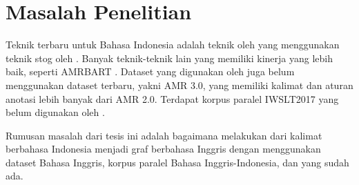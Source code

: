\section{Masalah Penelitian}

Teknik \crosslingual{} \amrparsing{} terbaru untuk Bahasa Indonesia adalah teknik oleh \textcite{putra2022} yang menggunakan teknik \gls{stog} oleh .
Banyak teknik-teknik lain yang memiliki kinerja \amrparsing{} yang lebih baik, seperti AMRBART .
Dataset yang digunakan oleh \textcite{putra2022} juga belum menggunakan dataset terbaru, yakni AMR 3.0, yang memiliki kalimat dan aturan anotasi lebih banyak dari AMR 2.0.
Terdapat korpus paralel IWSLT2017  yang belum digunakan oleh \textcite{putra2022}.

Rumusan masalah dari tesis ini adalah bagaimana melakukan \amrparsing{} dari kalimat berbahasa Indonesia menjadi graf \AMR{} berbahasa Inggris dengan menggunakan dataset \AMR{} Bahasa Inggris, korpus paralel Bahasa Inggris-Indonesia, dan \multil{}  yang sudah ada.
